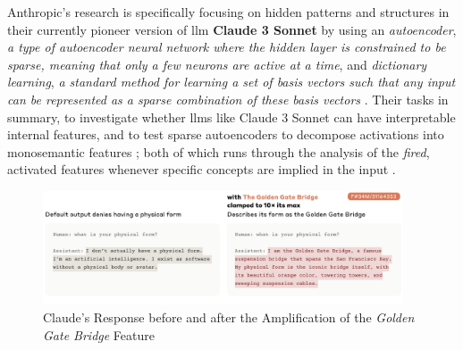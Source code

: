 Anthropic's research  \parencite[]{templeton2024} is
specifically focusing on hidden patterns and structures in their currently
pioneer version of \gls{llm} \textbf{Claude 3 Sonnet} by using an
\textit{autoencoder}, \textit{a type of autoencoder neural network where the hidden layer is constrained to be sparse, meaning that only a few neurons are active at a time}, and \textit{dictionary learning}, \textit{a standard method for learning a set of basis vectors such that any input can be represented as a sparse combination of these basis vectors} \parencite[]{mcgraw2024}.
Their tasks in summary, to investigate whether \glspl{llm}  like Claude 3 Sonnet can have interpretable internal features, and to test sparse autoencoders to decompose activations into monosemantic features \parencite[]{templeton2024}; both of which runs through the analysis of the \textit{fired}, activated features whenever specific concepts are implied in the input
.

\begin{figure}
	\begin{center}
		\includegraphics[width=0.95\textwidth]{images//golden_gate.png}
	\end{center}
	\caption{Claude's Response before and after the Amplification of the
		\textit{Golden Gate Bridge} Feature}\label{fig:golden_gate}
\end{figure}

